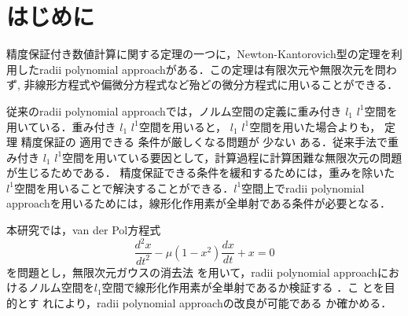 \documentclass[a4paper,10pt,twocolumn]{jsarticle}
\title{\vspace{-8mm}{\Large \gtfamily\mdseries\upshape 無限次元ガウスの消去法を用いた \rad{}改良 }\vspace{-3mm}}
\date{}
\author{（指導教員 関根 晃太 准教授） \\ 関根研究室 2131701 齋藤 悠希
\vspace{-5mm}}
\newcommand{\rad}{radii polynomial approach}
\newcommand{\nk}{Newton-Kantorovich}
\newcommand{\vdp}{van der Pol方程式}
\providecommand{\DIFaddtex}[1]{{\protect\color{blue} \sf #1}} %
\providecommand{\DIFdeltex}[1]{{\protect\color{red} \scriptsize #1}} %
\providecommand{\DIFaddbegin}{} %
\providecommand{\DIFaddend}{} %
\providecommand{\DIFdelbegin}{} %
\providecommand{\DIFdelend}{} %
\providecommand{\DIFadd}[1]{\texorpdfstring{\DIFaddtex{#1}}{#1}} %
\providecommand{\DIFdel}[1]{\texorpdfstring{\DIFdeltex{#1}}{}} %
\newcommand{\DIFscaledelfig}{0.5}
\newlength{\DIFdelgraphicswidth} %
\newlength{\DIFdelgraphicsheight} %
\newcommand{\DIFaddincludegraphics}[2][]{{\color{blue}\fbox{\DIFOincludegraphics[#1]{#2}}}} %
\newcommand{\DIFdelincludegraphics}[2][]{%
\sbox{\DIFdelgraphicsbox}{\DIFOincludegraphics[#1]{#2}}%
\settoboxwidth{\DIFdelgraphicswidth}{\DIFdelgraphicsbox} %
\settoboxtotalheight{\DIFdelgraphicsheight}{\DIFdelgraphicsbox} %
\scalebox{\DIFscaledelfig}{%
\parbox[b]{\DIFdelgraphicswidth}{\usebox{\DIFdelgraphicsbox}\\[-\baselineskip] \rule{\DIFdelgraphicswidth}{0em}}\llap{\resizebox{\DIFdelgraphicswidth}{\DIFdelgraphicsheight}{%
\setlength{\unitlength}{\DIFdelgraphicswidth}%
\begin{picture}(1,1)%
\thicklines\linethickness{2pt} %
{\color[rgb]{1,0,0}\put(0,0){\framebox(1,1){}}}%
{\color[rgb]{1,0,0}\put(0,0){\line( 1,1){1}}}%
{\color[rgb]{1,0,0}\put(0,1){\line(1,-1){1}}}%
\end{picture}%
}\hspace*{3pt}}} %
} %
\DeclareRobustCommand{\DIFaddbegin}{\DIFOaddbegin \let\includegraphics\DIFaddincludegraphics} %
\DeclareRobustCommand{\DIFaddend}{\DIFOaddend \let\includegraphics\DIFOincludegraphics} %
\DeclareRobustCommand{\DIFdelbegin}{\DIFOdelbegin \let\includegraphics\DIFdelincludegraphics} %
\DeclareRobustCommand{\DIFdelend}{\DIFOaddend \let\includegraphics\DIFOincludegraphics} %
\begin{document}
\maketitle
\vspace{-10mm}



\section{はじめに}
\vspace{-1mm}
精度保証付き数値計算に関する定理の一つに，\nk{}型の定理を利用した\rad{}がある．この定理は有限次元や無限次元を問わず, 非線形方程式や偏微分方程式など殆どの微分方程式に用いることができる．

従来の\rad{}では，ノルム空間の定義に重み付き\DIFdelbegin \DIFdel{$l_1$}\DIFdelend \DIFaddbegin \DIFadd{$l^1$}\DIFaddend 空間を用いている．重み付き\DIFdelbegin \DIFdel{$l_1$}\DIFdelend \DIFaddbegin \DIFadd{$l^1$}\DIFaddend 空間を用いると，\DIFdelbegin \DIFdel{$l_1$}\DIFdelend \DIFaddbegin \DIFadd{$l^1$}\DIFaddend 空間を用いた場合よりも，\DIFdelbegin \DIFdel{定理}\DIFdelend \DIFaddbegin \DIFadd{精度保証}\DIFaddend の\DIFdelbegin \DIFdel{適用}\DIFdelend できる\DIFaddbegin \DIFadd{条件が厳しくなる}\DIFaddend 問題が\DIFdelbegin \DIFdel{少ない}\DIFdelend \DIFaddbegin \DIFadd{ある}\DIFaddend ．従来手法で重み付き\DIFdelbegin \DIFdel{$l_1$}\DIFdelend \DIFaddbegin \DIFadd{$l^1$}\DIFaddend 空間を用いている要因として，計算過程に計算困難な無限次元の問題が生じるためである．\DIFaddbegin \DIFadd{精度保証できる条件を緩和するためには，重みを除いた$l^1$空間を用いることで解決することができる．$l^1$空間上で\rad{}を用いるためには，線形化作用素が全単射である条件が必要となる．
}\DIFaddend 

本研究では，\vdp{}
\begin{equation}
  \frac{d^2x}{dt^2} - \mu (1-x^2)\frac{dx}{dt}+x=0
\end{equation}
を問題とし，無限次元ガウスの消去法\DIFaddbegin \DIFadd{\cite{r1}}\DIFaddend を用いて，\rad{}におけるノルム空間を$l_1$空間で線形化作用素が全単射であるか検証する\DIFaddbegin \DIFadd{．}\DIFaddend こ\DIFdelbegin \DIFdel{とを目的とす}\DIFdelend \DIFaddbegin \DIFadd{れにより，\rad{}の改良が可能であ}\DIFaddend る\DIFaddbegin \DIFadd{か確かめる}\DIFaddend ．



\vspace{-1mm}
\end{document}
